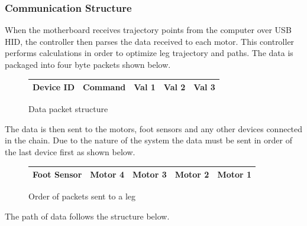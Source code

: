         \subsubsection{Communication Structure}
        When the motherboard receives trajectory points from the computer over USB HID, the controller then parses the data received to each motor. This controller performs calculations in order to optimize leg trajectory and paths. The data is packaged into four byte packets shown below.  
        \begin{figure}[H]
        \centering
        \begin{tabular}{|c|c|c|c|c|}
        \hline
        Device ID& Command & Val 1 & Val 2 & Val 3\\
        \hline
        \end{tabular}
        \caption{Data packet structure}
        \label{fig:DataPacketStructure}
        \end{figure}
        The data is then sent to the motors, foot sensors and any other devices connected in the chain. Due to the nature of the system the data must be sent in order of the last device first as shown below. 
        \begin{figure}[H]
        \centering
        \begin{tabular}{|c|c|c|c|c|}
        \hline
            Foot Sensor & Motor 4 & Motor 3 & Motor 2 & Motor 1  \\
            \hline
        \end{tabular}
        \caption{Order of packets sent to a leg}
        \label{fig:PacketOrder}
        \end{figure}
        The path of data follows the structure below.\newpage
